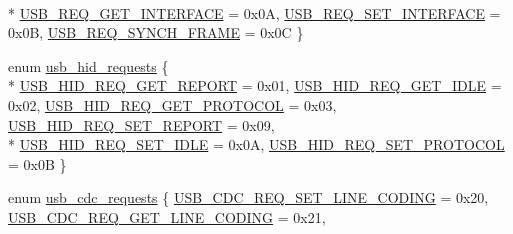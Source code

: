 \begin{DoxyCompactItemize}
\\*
\hyperlink{group___p_i_o_s___u_s_b___d_e_f_s_gga656cd9a1af7abe6ec812f6ee50b223f9a68374dc6cca8653dcd52953ba9f80b1c}{U\-S\-B\-\_\-\-R\-E\-Q\-\_\-\-G\-E\-T\-\_\-\-I\-N\-T\-E\-R\-F\-A\-C\-E} = 0x0\-A, 
\hyperlink{group___p_i_o_s___u_s_b___d_e_f_s_gga656cd9a1af7abe6ec812f6ee50b223f9a1af0d8916fca29961f41fb7433126527}{U\-S\-B\-\_\-\-R\-E\-Q\-\_\-\-S\-E\-T\-\_\-\-I\-N\-T\-E\-R\-F\-A\-C\-E} = 0x0\-B, 
\hyperlink{group___p_i_o_s___u_s_b___d_e_f_s_gga656cd9a1af7abe6ec812f6ee50b223f9a0d759eec2d7eab896e61ff927e1752d1}{U\-S\-B\-\_\-\-R\-E\-Q\-\_\-\-S\-Y\-N\-C\-H\-\_\-\-F\-R\-A\-M\-E} = 0x0\-C
 \}
\item 
enum \hyperlink{group___p_i_o_s___u_s_b___d_e_f_s_ga69bf8b3c0303204ae256d0d0304e9a1a}{usb\-\_\-hid\-\_\-requests} \{ \\*
\hyperlink{group___p_i_o_s___u_s_b___d_e_f_s_gga69bf8b3c0303204ae256d0d0304e9a1aabd25e49b43bbfd34245bb4e830754670}{U\-S\-B\-\_\-\-H\-I\-D\-\_\-\-R\-E\-Q\-\_\-\-G\-E\-T\-\_\-\-R\-E\-P\-O\-R\-T} = 0x01, 
\hyperlink{group___p_i_o_s___u_s_b___d_e_f_s_gga69bf8b3c0303204ae256d0d0304e9a1aa1cb84e32692150ae842c92d23982b410}{U\-S\-B\-\_\-\-H\-I\-D\-\_\-\-R\-E\-Q\-\_\-\-G\-E\-T\-\_\-\-I\-D\-L\-E} = 0x02, 
\hyperlink{group___p_i_o_s___u_s_b___d_e_f_s_gga69bf8b3c0303204ae256d0d0304e9a1aaab9bd5cca847e2a1874b3ff036c5ed81}{U\-S\-B\-\_\-\-H\-I\-D\-\_\-\-R\-E\-Q\-\_\-\-G\-E\-T\-\_\-\-P\-R\-O\-T\-O\-C\-O\-L} = 0x03, 
\hyperlink{group___p_i_o_s___u_s_b___d_e_f_s_gga69bf8b3c0303204ae256d0d0304e9a1aa43e7bee38a6eac8df0ab9de807be3e43}{U\-S\-B\-\_\-\-H\-I\-D\-\_\-\-R\-E\-Q\-\_\-\-S\-E\-T\-\_\-\-R\-E\-P\-O\-R\-T} = 0x09, 
\\*
\hyperlink{group___p_i_o_s___u_s_b___d_e_f_s_gga69bf8b3c0303204ae256d0d0304e9a1aab92ad24807bcb740ca992e6e955c8cb5}{U\-S\-B\-\_\-\-H\-I\-D\-\_\-\-R\-E\-Q\-\_\-\-S\-E\-T\-\_\-\-I\-D\-L\-E} = 0x0\-A, 
\hyperlink{group___p_i_o_s___u_s_b___d_e_f_s_gga69bf8b3c0303204ae256d0d0304e9a1aa3f1d0811a7b9bcbda126660237ada5af}{U\-S\-B\-\_\-\-H\-I\-D\-\_\-\-R\-E\-Q\-\_\-\-S\-E\-T\-\_\-\-P\-R\-O\-T\-O\-C\-O\-L} = 0x0\-B
 \}
\item 
enum \hyperlink{group___p_i_o_s___u_s_b___d_e_f_s_ga3544e22c57aa46b457ffbb09822caf9c}{usb\-\_\-cdc\-\_\-requests} \{ \hyperlink{group___p_i_o_s___u_s_b___d_e_f_s_gga3544e22c57aa46b457ffbb09822caf9ca9d77501626e12fe0b6391f3b06b46756}{U\-S\-B\-\_\-\-C\-D\-C\-\_\-\-R\-E\-Q\-\_\-\-S\-E\-T\-\_\-\-L\-I\-N\-E\-\_\-\-C\-O\-D\-I\-N\-G} = 0x20, 
\hyperlink{group___p_i_o_s___u_s_b___d_e_f_s_gga3544e22c57aa46b457ffbb09822caf9ca662294b19c769fd22c34bd45ce7b7edc}{U\-S\-B\-\_\-\-C\-D\-C\-\_\-\-R\-E\-Q\-\_\-\-G\-E\-T\-\_\-\-L\-I\-N\-E\-\_\-\-C\-O\-D\-I\-N\-G} = 0x21, 

\end{DoxyCompactItemize}

